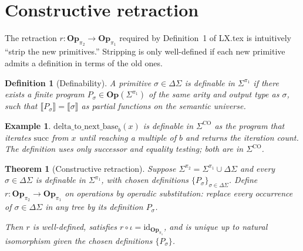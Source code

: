 \documentclass[11pt]{article}
\newtheorem{definition}{Definition}
\newtheorem{theorem}{Theorem}
\newtheorem{example}{Example}
\begin{document}
\section{Constructive retraction}\label{sec:retraction}

The retraction $r : \mathbf{Op}_{\pi_2} \to \mathbf{Op}_{\pi_1}$
required by Definition~1 of LX.tex is intuitively ``strip the new
primitives.'' Stripping is only well-defined if each new primitive
admits a definition in terms of the old ones.

\begin{definition}[Definability]\label{def:definable}
A primitive $\sigma \in \Delta\Sigma$ is \emph{definable in
$\Sigma^{\pi_1}$} if there exists a finite program
$P_\sigma \in \mathbf{Op}(\Sigma^{\pi_1})$ of the same arity and
output type as $\sigma$, such that
$\llbracket P_\sigma \rrbracket = \llbracket \sigma \rrbracket$
as partial functions on the semantic universe.
\end{definition}

\begin{example}
$\mathrm{delta\_to\_next\_base}_b(x)$ is definable in
$\Sigma^{\mathrm{CO}}$ as the program that iterates
$\mathrm{succ}$ from $x$ until reaching a multiple of $b$ and returns
the iteration count. The definition uses only successor and equality
testing; both are in $\Sigma^{\mathrm{CO}}$.
\end{example}

\begin{theorem}[Constructive retraction]\label{thm:retraction}
Suppose $\Sigma^{\pi_2} = \Sigma^{\pi_1} \cup \Delta\Sigma$ and every
$\sigma \in \Delta\Sigma$ is definable in $\Sigma^{\pi_1}$, with
chosen definitions $\{P_\sigma\}_{\sigma \in \Delta\Sigma}$. Define
$r : \mathbf{Op}_{\pi_2} \to \mathbf{Op}_{\pi_1}$ on operations by
operadic substitution: replace every occurrence of $\sigma \in
\Delta\Sigma$ in any tree by its definition $P_\sigma$.

Then $r$ is well-defined, satisfies $r \circ \iota =
\mathrm{id}_{\mathbf{Op}_{\pi_1}}$, and is unique up to natural
isomorphism given the chosen definitions $\{P_\sigma\}$.
\end{theorem}
\end{document}
